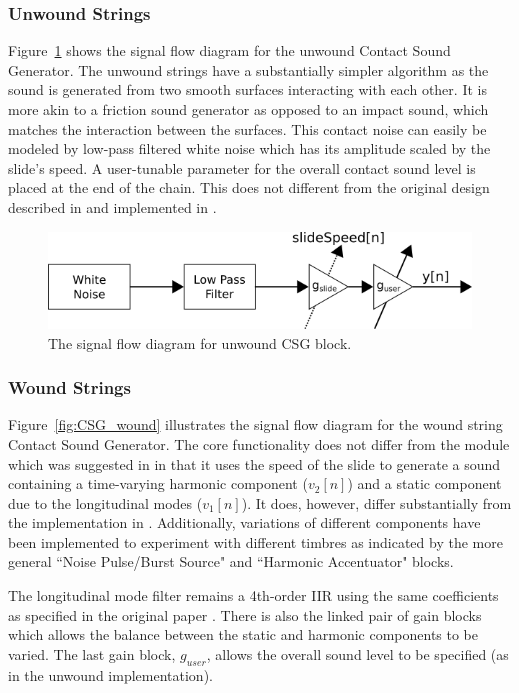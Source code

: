 \documentclass[../main.tex]{subfiles}
\begin{document}
\subsubsection{Unwound Strings}
Figure~\ref{fig:CSG_unwound} shows the signal flow diagram for the unwound Contact Sound Generator. The unwound strings have a substantially simpler algorithm as the sound is generated from two smooth surfaces interacting with each other. It is more akin to a friction sound generator as opposed to an impact sound, which matches the interaction between the surfaces. This contact noise can easily be modeled by low-pass filtered white noise which has its amplitude scaled by the slide's speed. A user-tunable parameter for the overall contact sound level is placed at the end of the chain. This does not different from the original design described in  and implemented in .

\begin{figure}[h]
    \centering
    \includegraphics[scale=.5]{./images/diagrams/CSG_unwound.png}
    \caption{The signal flow diagram for unwound CSG block.}
    \label{fig:CSG_unwound}
\end{figure}

\subsubsection{Wound Strings}
Figure~\ref{fig:CSG_wound} illustrates the signal flow diagram for the wound string Contact Sound Generator. The core functionality does not differ from the module which was suggested in  in that it uses the speed of the slide to generate a sound containing a time-varying harmonic component ($v_2[n]$) and a static component due to the longitudinal modes ($v_1[n]$). It does, however,  differ substantially from the implementation in . Additionally, variations of different components have been implemented to experiment with different timbres as indicated by the more general ``Noise Pulse/Burst Source" and ``Harmonic Accentuator" blocks.

The longitudinal mode filter remains a 4th-order IIR using the same coefficients as specified in the original paper . There is also the linked pair of gain blocks which allows the balance between the static and harmonic components to be varied. The last gain block, $g_{user}$, allows the overall sound level to be specified (as in the unwound implementation).
\end{document}
